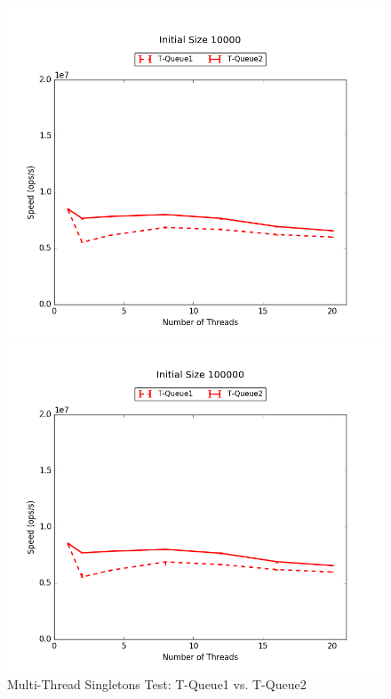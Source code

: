 \begin{figure}[H]
    \centering
	\begin{minipage}{0.5\textwidth}\includegraphics[width=\textwidth]{fcqueues/stoQ:RandSingleOps10000.png}
    \end{minipage}
	\begin{minipage}{0.45\textwidth}
    
    \end{minipage}
	\begin{minipage}{0.5\textwidth}\includegraphics[width=\textwidth]{fcqueues/stoQ:RandSingleOps100000.png}
    \end{minipage}
	\begin{minipage}{0.45\textwidth}
    
    \end{minipage}
\caption{Multi-Thread Singletons Test: T-Queue1 vs. T-Queue2}
\label{fig:stoqueues}
\end{figure}

